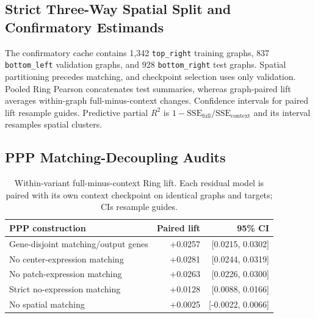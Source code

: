\subsection{Strict Three-Way Spatial Split and Confirmatory Estimands}
\label{app:strict_three_way}
The confirmatory cache contains 1,342 \texttt{top\_right} training graphs, 837 \texttt{bottom\_left} validation graphs, and 928 \texttt{bottom\_right} test graphs. Spatial partitioning precedes matching, and checkpoint selection uses only validation. Pooled Ring Pearson concatenates test summaries, whereas graph-paired lift averages within-graph full-minus-context changes. Confidence intervals for paired lift resample guides. Predictive partial $R^2$ is $1-\mathrm{SSE}_{\mathrm{full}}/\mathrm{SSE}_{\mathrm{context}}$ and its interval resamples spatial clusters.

\subsection{PPP Matching-Decoupling Audits}
\label{app:ppp_decoupling_generated}
\begin{table}[h]
\centering\scriptsize
\caption{Within-variant full-minus-context Ring lift. Each residual model is paired with its own context checkpoint on identical graphs and targets; CIs resample guides.}
\label{tab:app_ppp_decoupling}
\begin{tabular}{lrr}
\toprule
PPP construction & Paired lift & 95\% CI \\
\midrule
Gene-disjoint matching/output genes & +0.0257 & [0.0215, 0.0302] \\
No center-expression matching & +0.0281 & [0.0244, 0.0319] \\
No patch-expression matching & +0.0263 & [0.0226, 0.0300] \\
Strict no-expression matching & +0.0128 & [0.0088, 0.0166] \\
No spatial matching & +0.0025 & [-0.0022, 0.0066] \\
\bottomrule
\end{tabular}
\end{table}

